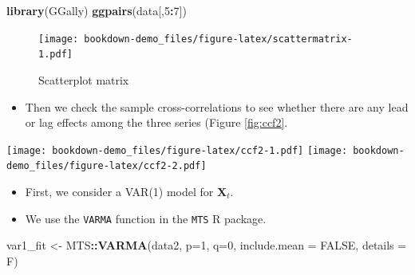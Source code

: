 \documentclass[]{book}
\newenvironment{Shaded}{\begin{snugshade}}{\end{snugshade}}
\newcommand{\DataTypeTok}[1]{\textcolor[rgb]{0.13,0.29,0.53}{#1}}
\newcommand{\DecValTok}[1]{\textcolor[rgb]{0.00,0.00,0.81}{#1}}
\newcommand{\KeywordTok}[1]{\textcolor[rgb]{0.13,0.29,0.53}{\textbf{#1}}}
\newcommand{\NormalTok}[1]{#1}
\newcommand{\OperatorTok}[1]{\textcolor[rgb]{0.81,0.36,0.00}{\textbf{#1}}}
\newcommand{\OtherTok}[1]{\textcolor[rgb]{0.56,0.35,0.01}{#1}}
\newcommand{\StringTok}[1]{\textcolor[rgb]{0.31,0.60,0.02}{#1}}
\providecommand{\tightlist}{%
  \setlength{\itemsep}{0pt}\setlength{\parskip}{0pt}}
\begin{document}
\begin{Shaded}
\begin{Highlighting}[]
\KeywordTok{library}\NormalTok{(GGally)}
\KeywordTok{ggpairs}\NormalTok{(data[,}\DecValTok{5}\OperatorTok{:}\DecValTok{7}\NormalTok{])}
\end{Highlighting}
\end{Shaded}

\begin{figure}
\centering
\texttt{[image: bookdown-demo\_files/figure-latex/scattermatrix-1.pdf]}
\caption{\label{fig:scattermatrix}Scatterplot matrix}
\end{figure}

\begin{itemize}
\tightlist
\item
  Then we check the sample cross-correlations to see whether there are any lead or lag effects among the three series (Figure \ref{fig:ccf2}.
\end{itemize}

\begin{Shaded}
\end{Shaded}

\texttt{[image: bookdown-demo\_files/figure-latex/ccf2-1.pdf]} \texttt{[image: bookdown-demo\_files/figure-latex/ccf2-2.pdf]}

\begin{itemize}
\tightlist
\item
  First, we consider a VAR(1) model for \(\mathbf{X}_t\).
\item
  We use the \texttt{VARMA} function in the \texttt{MTS} R package.
\end{itemize}

\begin{Shaded}
\begin{Highlighting}[]
\NormalTok{var1_fit <-}\StringTok{ }\NormalTok{MTS}\OperatorTok{::}\KeywordTok{VARMA}\NormalTok{(data2, }\DataTypeTok{p=}\DecValTok{1}\NormalTok{, }\DataTypeTok{q=}\DecValTok{0}\NormalTok{, }\DataTypeTok{include.mean =} \OtherTok{FALSE}\NormalTok{, }\DataTypeTok{details =}\NormalTok{ F)}
\end{Highlighting}
\end{Shaded}
\end{document}
